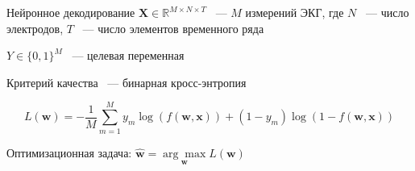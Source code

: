 \documentclass[10pt,pdf,hyperref={unicode}]{beamer}
\newcommand{\bx}{\mathbf{x}}
\newcommand{\bw}{\mathbf{w}}
\newcommand{\bX}{\mathbf{X}}
\newcommand{\dR}{\mathds{R}}
\begin{document}

\begin{frame}{Нейронное декодирование}
	$\bX \in \dR^{M \times N \times T}$ ~--- $M$ измерений ЭКГ, где $N$ ~--- число электродов, $T$ ~--- число элементов временного ряда
	
	$Y \in \{ 0, 1\}^M$ ~--- целевая переменная
	
	Критерий качества ~--- бинарная кросс-энтропия  
	
	$$ L(\bw) = -\dfrac{1}{M} \sum\limits_{m=1}^M y_m \log(f(\bw, \bx)) + (1 - y_m) \log(1 - f(\bw, \bx))$$
	
	Оптимизационная задача: $\hat{\bw} = \underset{\bw}{\arg \max} L(\bw)$
\end{frame}
\end{document}
